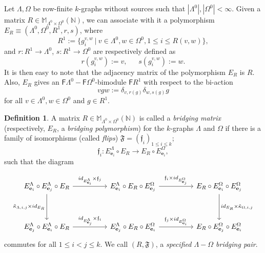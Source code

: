 \documentclass[12pt]{amsart}
\theoremstyle{definition}
\newtheorem{dfn}[thm]{Definition}
\theoremstyle{remark}
\begin{document}
Let $\Lambda,\Omega$ be row-finite $k$-graphs without sources such that $|\Lambda^0|,|\Omega^0|< \infty$. Given a matrix $R\in \mathbb{M}_{\Lambda^0\times \Omega^0}(\mathbb{N})$, we can associate with it a polymorphism $E_R\equiv (\Lambda^0,\Omega^0,R^1,r,s)$, where \[R^1:=\{g_i^{v,w}~|~v\in \Lambda^0,w\in \Omega^0, 1\le i\le R(v,w)\},\] and $r:R^1\longrightarrow \Lambda^0$, $s:R^1\longrightarrow \Omega^0$ are respectively defined as \[r(g_i^{v,w}):=v,~~~~~~~s(g_i^{v,w}):=w.\]
It is then easy to note that the adjacency matrix of the polymorphism $E_R$ is $R$. Also, $E_R$ gives an $\mathsf{F}\Lambda^0-\mathsf{F}\Omega^0$-bimodule $\mathsf{F}R^1$ with respect to the bi-action \[vgw:=\delta_{v,r(g)}\delta_{w,s(g)}g\] for all $v\in \Lambda^0,w\in \Omega^0$ and $g\in R^1$.
\begin{dfn}\label{def the bridging matrix and polymorphism}
A matrix $R\in \mathbb{M}_{\Lambda^0\times \Omega^0}(\mathbb{N})$ is called a \emph{bridging matrix} (respectively, $E_R$, a \emph{bridging polymorphism}) for the $k$-graphs $\Lambda$ and $\Omega$ if there is a family of isomorphisms (called \emph{flips}) $\mathfrak{F}=(\mathfrak{f}_i)_{1\le i\le k}$; \[\mathfrak{f}_i:E_{\mathbf{e}_i}^\Lambda\circ E_R\longrightarrow E_R\circ E_{\mathbf{e}_i}^\Omega,\] such that the diagram 

\begin{equation}\label{comd3}
\begin{tikzcd}[row sep=huge, column sep=huge]
		E_{\mathbf{e}_i}^\Lambda\circ E_{\mathbf{e}_j}^\Lambda \circ E_R \arrow [r, "id_{E_{\mathbf{e}_i}^\Lambda}\times \mathfrak{f}_j"] \arrow [d, "\Tilde{\kappa}_{\Lambda,i,j}\times id_{E_R}"'] & E_{\mathbf{e}_i}^\Lambda \circ E_R \circ E_{\mathbf{e}_j}^\Omega \arrow [r, "\mathfrak{f}_i\times id_{E_{\mathbf{e}_j}^\Omega}"] & E_R\circ E_{\mathbf{e}_i}^\Omega \circ E_{\mathbf{e}_j}^\Omega \arrow [d, "id_{E_R}\times \Tilde{\kappa}_{\Omega,i,j}"] \\	
         E_{\mathbf{e}_j}^\Lambda\circ E_{\mathbf{e}_i}^\Lambda \circ E_R \arrow [r, "id_{E_{\mathbf{e}_j}^\Lambda}\times \mathfrak{f}_i"] & E_{\mathbf{e}_j}^\Lambda \circ E_R\circ E_{\mathbf{e}_i}^\Omega \arrow [r, "\mathfrak{f}_j\times id_{E_{\mathbf{e}_i}^\Omega}"] & E_R\circ E_{\mathbf{e}_j}^\Omega \circ E_{\mathbf{e}_i}^\Omega
\end{tikzcd} 
\end{equation}
commutes for all $1\le i < j \le k$. We call $(R,\mathfrak{F})$, a \emph{specified $\Lambda-\Omega$ bridging pair}. 
\end{dfn}
\end{document}
